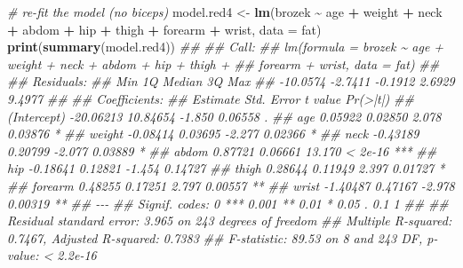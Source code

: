 \documentclass[
]{book}
\newenvironment{Shaded}{\begin{snugshade}}{\end{snugshade}}
\newcommand{\CommentTok}[1]{\textcolor[rgb]{0.56,0.35,0.01}{\textit{#1}}}
\newcommand{\DataTypeTok}[1]{\textcolor[rgb]{0.13,0.29,0.53}{#1}}
\newcommand{\KeywordTok}[1]{\textcolor[rgb]{0.13,0.29,0.53}{\textbf{#1}}}
\newcommand{\NormalTok}[1]{#1}
\newcommand{\OperatorTok}[1]{\textcolor[rgb]{0.81,0.36,0.00}{\textbf{#1}}}
\newcommand{\StringTok}[1]{\textcolor[rgb]{0.31,0.60,0.02}{#1}}
\theoremstyle{definition}
\theoremstyle{definition}
\theoremstyle{definition}
\theoremstyle{remark}
\begin{document}
\begin{Shaded}
\begin{Highlighting}[]
\CommentTok{\# re{-}fit the model (no biceps)}
\NormalTok{model.red4 \textless{}{-}}\StringTok{ }\KeywordTok{lm}\NormalTok{(brozek }\OperatorTok{\textasciitilde{}}\StringTok{ }\NormalTok{age }\OperatorTok{+}\StringTok{ }\NormalTok{weight }\OperatorTok{+}\StringTok{ }\NormalTok{neck }\OperatorTok{+}\StringTok{ }\NormalTok{abdom }\OperatorTok{+}\StringTok{ }\NormalTok{hip }\OperatorTok{+}\StringTok{ }\NormalTok{thigh  }\OperatorTok{+}\StringTok{ }\NormalTok{forearm }\OperatorTok{+}\StringTok{ }\NormalTok{wrist, }\DataTypeTok{data =}\NormalTok{ fat)}
\KeywordTok{print}\NormalTok{(}\KeywordTok{summary}\NormalTok{(model.red4))}
\CommentTok{\#\# }
\CommentTok{\#\# Call:}
\CommentTok{\#\# lm(formula = brozek \textasciitilde{} age + weight + neck + abdom + hip + thigh + }
\CommentTok{\#\#     forearm + wrist, data = fat)}
\CommentTok{\#\# }
\CommentTok{\#\# Residuals:}
\CommentTok{\#\#      Min       1Q   Median       3Q      Max }
\CommentTok{\#\# {-}10.0574  {-}2.7411  {-}0.1912   2.6929   9.4977 }
\CommentTok{\#\# }
\CommentTok{\#\# Coefficients:}
\CommentTok{\#\#              Estimate Std. Error t value Pr(\textgreater{}|t|)    }
\CommentTok{\#\# (Intercept) {-}20.06213   10.84654  {-}1.850  0.06558 .  }
\CommentTok{\#\# age           0.05922    0.02850   2.078  0.03876 *  }
\CommentTok{\#\# weight       {-}0.08414    0.03695  {-}2.277  0.02366 *  }
\CommentTok{\#\# neck         {-}0.43189    0.20799  {-}2.077  0.03889 *  }
\CommentTok{\#\# abdom         0.87721    0.06661  13.170  \textless{} 2e{-}16 ***}
\CommentTok{\#\# hip          {-}0.18641    0.12821  {-}1.454  0.14727    }
\CommentTok{\#\# thigh         0.28644    0.11949   2.397  0.01727 *  }
\CommentTok{\#\# forearm       0.48255    0.17251   2.797  0.00557 ** }
\CommentTok{\#\# wrist        {-}1.40487    0.47167  {-}2.978  0.00319 ** }
\CommentTok{\#\# {-}{-}{-}}
\CommentTok{\#\# Signif. codes:  0 \textquotesingle{}***\textquotesingle{} 0.001 \textquotesingle{}**\textquotesingle{} 0.01 \textquotesingle{}*\textquotesingle{} 0.05 \textquotesingle{}.\textquotesingle{} 0.1 \textquotesingle{} \textquotesingle{} 1}
\CommentTok{\#\# }
\CommentTok{\#\# Residual standard error: 3.965 on 243 degrees of freedom}
\CommentTok{\#\# Multiple R{-}squared:  0.7467,	Adjusted R{-}squared:  0.7383 }
\CommentTok{\#\# F{-}statistic: 89.53 on 8 and 243 DF,  p{-}value: \textless{} 2.2e{-}16}


\end{Highlighting}
\end{Shaded}
\end{document}
